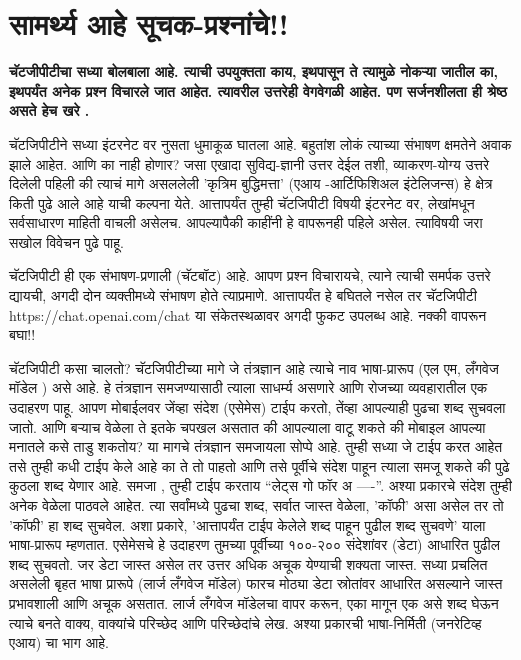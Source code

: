 \chapter{सामर्थ्य आहे सूचक-प्रश्नांचे!!}

{\textbf{चॅटजीपीटीचा सध्या बोलबाला आहे.  त्याची उपयुक्तता काय,  इथपासून ते त्यामुळे नोकऱ्या जातील का,  इथपर्यंत अनेक प्रश्न विचारले जात आहेत.  त्यावरील उत्तरेही वेगवेगळी आहेत.  पण सर्जनशीलता ही श्रेष्ठ असते हेच खरे .  }}

\vspace{1.5em}

चॅटजिपीटीने सध्या इंटरनेट वर नुसता धुमाकूळ घातला आहे. बहुतांश लोकं त्याच्या संभाषण क्षमतेने अवाक झाले आहेत. आणि का नाही होणार? जसा एखादा सुविद्य-ज्ञानी उत्तर देईल तशी, व्याकरण-योग्य उत्तरे दिलेली पहिली की त्याचं मागे असललेली 'कृत्रिम बुद्धिमत्ता' (एआय -आर्टिफिशिअल इंटेलिजन्स) हे क्षेत्र किती पुढे आले आहे याची कल्पना येते. आत्तापर्यंत तुम्ही चॅटजिपीटी विषयी इंटरनेट वर, लेखांमधून सर्वसाधारण माहिती वाचली असेलच. आपल्यापैकी काहींनी हे वापरूनही पहिले असेल. त्याविषयी जरा सखोल विवेचन पुढे पाहू.

चॅटजिपीटी ही एक संभाषण-प्रणाली (चॅटबॉट) आहे. आपण प्रश्न विचारायचे, त्याने त्याची समर्पक उत्तरे द्यायची, अगदी दोन व्यक्तीमध्ये संभाषण होते त्याप्रमाणे. आत्तापर्यंत हे बघितले नसेल तर चॅटजिपीटी https://chat.openai.com/chat या संकेतस्थळावर अगदी फुकट उपलब्ध आहे. नक्की वापरून बघा!!

चॅटजिपीटी कसा चालतो?
चॅटजिपीटीच्या मागे जे तंत्रज्ञान आहे त्याचे नाव भाषा-प्रारूप (एल एम, लँगवेज मॉडेल ) असे आहे. हे तंत्रज्ञान समजण्यासाठी त्याला साधर्म्य असणारे आणि रोजच्या व्यवहारातील एक उदाहरण पाहू. आपण मोबाईलवर जेंव्हा संदेश (एसेमेस) टाईप करतो, तेंव्हा आपल्याही पुढचा शब्द सुचवला जातो. आणि बऱ्याच वेळेला ते इतके चपखल असतात की आपल्याला वाटू शकते की मोबाइल आपल्या मनातले कसे ताडु शकतोय? या मागचे तंत्रज्ञान समजायला सोप्पे आहे. तुम्ही सध्या जे टाईप करत आहेत तसे तुम्ही कधी टाईप केले आहे का ते तो पाहतो आणि तसे पूर्वीचे संदेश पाहून त्याला समजू शकते की पुढे कुठला शब्द येणार आहे. समजा , तुम्ही टाईप करताय ``लेट्स गो फॉर अ ----''. अश्या प्रकारचे संदेश तुम्ही अनेक वेळेला पाठवले आहेत. त्या सर्वांमध्ये पुढचा शब्द, सर्वात जास्त वेळेला, 'कॉफी' असा असेल तर तो 'कॉफी' हा शब्द सुचवेल. अशा प्रकारे, 'आत्तापर्यंत टाईप केलेले शब्द पाहून पुढील शब्द सुचवणे' याला भाषा-प्रारूप म्हणतात. एसेमेसचे हे उदाहरण तुमच्या पूर्वीच्या १००-२०० संदेशांवर (डेटा) आधारित पुढील शब्द सुचवतो. जर डेटा जास्त असेल तर उत्तर अधिक अचूक येण्याची शक्यता जास्त. सध्या प्रचलित असलेली बृहत भाषा प्रारूपे (लार्ज लँगवेज मॉडेल) फारच मोठ्या डेटा स्रोतांवर आधारित असल्याने जास्त प्रभावशाली आणि अचूक असतात. लार्ज लँगवेज मॉडेलचा वापर करून, एका मागून एक असे शब्द घेऊन त्याचे बनते वाक्य, वाक्यांचे परिच्छेद आणि परिच्छेदांचे लेख. अश्या प्रकारची भाषा-निर्मिती (जनरेटिव्ह एआय) चा भाग आहे.

